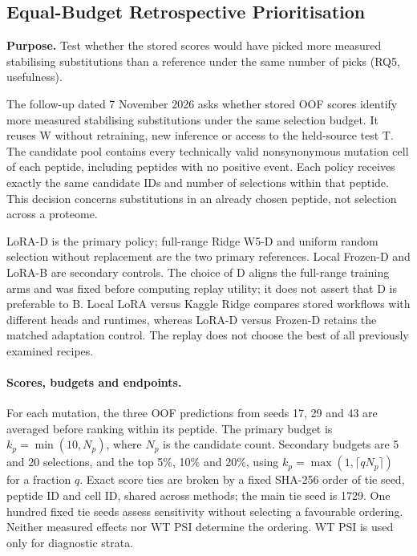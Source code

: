 \subsection{Equal-Budget Retrospective Prioritisation}\label{sec:priority-methods}
\textbf{Purpose.} Test whether the stored scores would have picked more measured stabilising substitutions than a reference under the same number of picks (RQ5, usefulness).

The follow-up dated 7 November 2026 asks whether stored OOF scores identify more measured
stabilising substitutions under the same selection budget. It reuses W without retraining,
new inference or access to the held-source test T. The candidate pool contains every technically
valid nonsynonymous mutation cell of each peptide, including peptides with no positive event.
Each policy receives exactly the same candidate IDs and number of selections within that peptide.
This decision concerns substitutions in an already chosen peptide, not selection across a proteome.

LoRA-D is the primary policy; full-range Ridge W5-D and uniform random selection without
replacement are the two primary references. Local Frozen-D and LoRA-B are secondary controls.
The choice of D aligns the full-range training arms and was fixed before computing replay utility;
it does not assert that D is preferable to B. Local LoRA versus Kaggle Ridge compares stored
workflows with different heads and runtimes, whereas LoRA-D versus Frozen-D retains the matched
adaptation control. The replay does not choose the best of all previously examined recipes.

\paragraph{Scores, budgets and endpoints.}
For each mutation, the three OOF predictions from seeds 17, 29 and 43 are averaged before ranking
within its peptide. The primary budget is $k_p=\min(10,N_p)$, where $N_p$ is the candidate count.
Secondary budgets are 5 and 20 selections, and the top 5\%, 10\% and 20\%, using
$k_p=\max(1,\lceil qN_p\rceil)$ for a fraction $q$. Exact score ties are broken by a fixed SHA-256
order of tie seed, peptide ID and cell ID, shared across methods; the main tie seed is 1729.
One hundred fixed tie seeds assess sensitivity without selecting a favourable ordering.
Neither measured effects nor WT PSI determine the ordering. WT PSI is used only for diagnostic strata.

